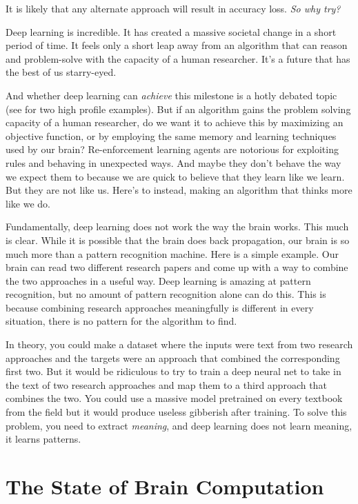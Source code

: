 \documentclass{article}
\begin{document}
It is likely that any alternate approach will result in accuracy loss. \textit{So why try? }

Deep learning is incredible. It has created a massive societal change in a short period of time.  It feels only a short leap away from an algorithm that can reason and problem-solve with the capacity of a human researcher. It's a future that has the best of us starry-eyed.

And whether deep learning can \textit{achieve} this milestone is a hotly debated topic (see \cite{Fjelland2020, Silver2021} for two high profile examples). But if an algorithm gains the problem solving capacity of a human researcher, do we want it to achieve this by maximizing an objective function, or by employing the same memory and learning techniques used by our brain? Re-enforcement learning agents are notorious for exploiting rules and behaving in unexpected ways. And maybe they don't behave the way we expect them to because we are quick to believe that they learn like we learn. But they are not like us. Here's to instead, making an algorithm that thinks more like we do. 

Fundamentally, deep learning does not work the way the brain works. This much is clear. While it is possible that the brain does back propagation, our brain is so much more than a pattern recognition machine. Here is a simple example. Our brain can read two different research papers and come up with a way to combine the two approaches in a useful way. Deep learning is amazing at pattern recognition, but no amount of pattern recognition alone can do this. This is because combining research approaches meaningfully is different in every situation, there is no pattern for the algorithm to find. 

In theory, you could make a dataset where the inputs were text from two research approaches and the targets were an approach that combined the corresponding first two. But it would be ridiculous to try to train a deep neural net to take in the text of two research approaches and  map them to a third approach that combines the two. You could use a massive model pretrained on every textbook from the field but it would produce useless gibberish after training. To solve this problem, you need to extract \textit{meaning}, and deep learning does not learn meaning, it learns patterns.

\section*{The State of Brain Computation}
\end{document}
